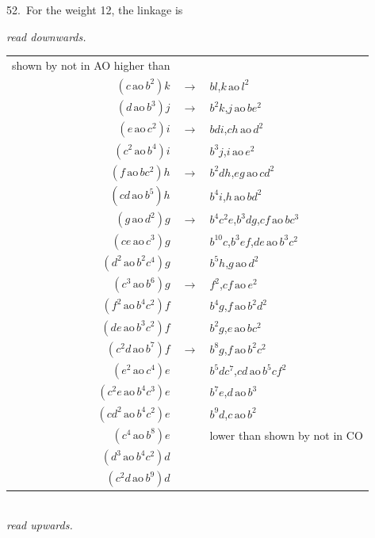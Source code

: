 \documentclass[11pt]{article}
\begin{document}
52.\ For the weight 12, the linkage is
\begin{center}
\textit{read downwards.}\\[2pt]
\begin{tabular}{r@{\;}c@{\;}l}
shown by not in AO higher than & & \\
$(c\,\mathrm{ao}\,b^2)k$ & $\longrightarrow$ & $bl$,\quad $k\,\mathrm{ao}\,l^2$ \\
$(d\,\mathrm{ao}\,b^3)j$ & $\longrightarrow$ & $b^2 k$,\quad $j\,\mathrm{ao}\,be^2$ \\
$(e\,\mathrm{ao}\,c^2)i$ & $\longrightarrow$ & $bdi$,\quad $ch\,\mathrm{ao}\,d^2$ \\
$(c^2\,\mathrm{ao}\,b^4)i$ & & $b^3 j$,\quad $i\,\mathrm{ao}\,e^2$ \\
$(f\,\mathrm{ao}\,bc^2)h$ & $\longrightarrow$ & $b^2 dh$,\quad $eg\,\mathrm{ao}\,cd^2$ \\
$(cd\,\mathrm{ao}\,b^5)h$ & & $b^4 i$,\quad $h\,\mathrm{ao}\,bd^2$ \\
$(g\,\mathrm{ao}\,d^2)g$ & $\longrightarrow$ & $b^4 c^2 e$,\quad $b^3 dg$,\quad $cf\,\mathrm{ao}\,bc^3$ \\
$(ce\,\mathrm{ao}\,c^3)g$ & & $b^{10}c$,\quad $b^3 ef$,\quad $de\,\mathrm{ao}\,b^3 c^2$ \\
$(d^2\,\mathrm{ao}\,b^2 c^4)g$ & & $b^5 h$,\quad $g\,\mathrm{ao}\,d^2$ \\
$(c^3\,\mathrm{ao}\,b^6)g$ & $\longrightarrow$ & $f^2$,\quad $cf\,\mathrm{ao}\,e^2$ \\
$(f^2\,\mathrm{ao}\,b^4 c^2)f$ & & $b^4 g$,\quad $f\,\mathrm{ao}\,b^2 d^2$ \\
$(de\,\mathrm{ao}\,b^3 c^2)f$ & & $b^2 g$,\quad $e\,\mathrm{ao}\,b c^2$ \\
$(c^2 d\,\mathrm{ao}\,b^7)f$ & $\longrightarrow$ & $b^8 g$,\quad $f\,\mathrm{ao}\,b^2 c^2$ \\
$(e^2\,\mathrm{ao}\,c^4)e$ & & $b^5 d c^7$,\quad $cd\,\mathrm{ao}\,b^5 c f^2$ \\
$(c^2 e\,\mathrm{ao}\,b^4 c^3)e$ & & $b^7 e$,\quad $d\,\mathrm{ao}\,b^3$ \\
$(c d^2\,\mathrm{ao}\,b^4 c^2)e$ & & $b^9 d$,\quad $c\,\mathrm{ao}\,b^2$ \\
$(c^4\,\mathrm{ao}\,b^8)e$ & & lower than shown by not in CO \\
$(d^3\,\mathrm{ao}\,b^4 c^2)d$ & & \\
$(c^2 d\,\mathrm{ao}\,b^9)d$ & & \\
\end{tabular}\\[2pt]
\textit{read upwards.}
\end{center}
\end{document}
